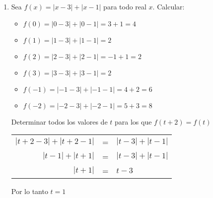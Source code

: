 \begin{enumerate}
        \item Sea $f(x)=|x-3|+|x-1|$ para todo real $x$. Calcular:\\
            \begin{itemize}
                \item $f(0) = |0-3|+|0-1| = 3 + 1 = 4$
                \item $f(1) = |1-3|+|1-1| = 2$
                \item $f(2) = |2-3|+|2-1| = -1 + 1 = 2$
                \item $f(3) = |3-3|+|3-1| = 2$
                \item $f(-1) = |-1-3|+|-1-1| = 4 + 2 = 6$
                \item $f(-2) = |-2-3|+|-2-1| = 5 + 3 = 8$\\
            \end{itemize}
            Determinar todos los valores de $t$ para los que $f(t+2)=f(t)$\\
            \begin{center}
                \begin{tabular}{r c l}
                    $|t+2-3| + |t+2-1|$&=&$|t-3| + |t-1|$\\
                    $|t-1|+|t+1|$&=&$|t-3|+|t-1|$\\
                    $|t+1|$&=&$t-3$\\
                \end{tabular}
            \end{center}
            Por lo tanto  $t=1$\\\\



\end{enumerate}
